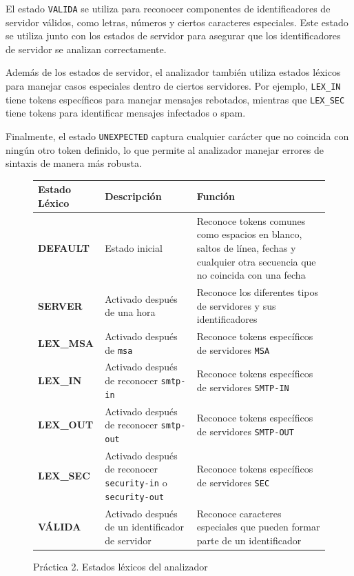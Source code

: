 El estado \lstinline|VALIDA| se utiliza para reconocer componentes de identificadores de servidor válidos, como letras, números y ciertos caracteres especiales. Este estado se utiliza junto con los estados de servidor para asegurar que los identificadores de servidor se analizan correctamente.

Además de los estados de servidor, el analizador también utiliza estados léxicos para manejar casos especiales dentro de ciertos servidores. Por ejemplo, \lstinline|LEX_IN| tiene tokens específicos para manejar mensajes rebotados, mientras que \lstinline|LEX_SEC| tiene tokens para identificar mensajes infectados o spam.

Finalmente, el estado \lstinline|UNEXPECTED| captura cualquier carácter que no coincida con ningún otro token definido, lo que permite al analizador manejar errores de sintaxis de manera más robusta.

\begin{figure}[H]
  \centering
  \begin{tabularx}{\textwidth}{>{\bfseries}l X X}
  \toprule
  \textbf{Estado Léxico} & \textbf{Descripción} & \textbf{Función} \\
  \midrule
  DEFAULT & Estado inicial & Reconoce tokens comunes como espacios en blanco, saltos de línea, fechas y cualquier otra secuencia que no coincida con una fecha \\
  \midrule
  SERVER & Activado después de una hora & Reconoce los diferentes tipos de servidores y sus identificadores \\
  \midrule
  LEX\_MSA & Activado después de \lstinline|msa| & Reconoce tokens específicos de servidores \lstinline|MSA|\\
  \midrule
  LEX\_IN & Activado después de reconocer \lstinline|smtp-in|& Reconoce tokens específicos de servidores \lstinline|SMTP-IN|\\
  \midrule
  LEX\_OUT & Activado después de reconocer \lstinline|smtp-out|& Reconoce tokens específicos de servidores \lstinline|SMTP-OUT| \\
  \midrule
  LEX\_SEC & Activado después de reconocer \lstinline|security-in| o \lstinline|security-out| & Reconoce tokens específicos de servidores \lstinline|SEC| \\
  \midrule
  VÁLIDA & Activado después de un identificador de servidor & Reconoce caracteres especiales que pueden formar parte de un identificador \\
  \bottomrule
  \end{tabularx}
  \caption{\label{fig:tablaestadoslexicosp2}Práctica 2. Estados léxicos del analizador}
  \label{table:lexical_statesp2}
  \end{figure}

